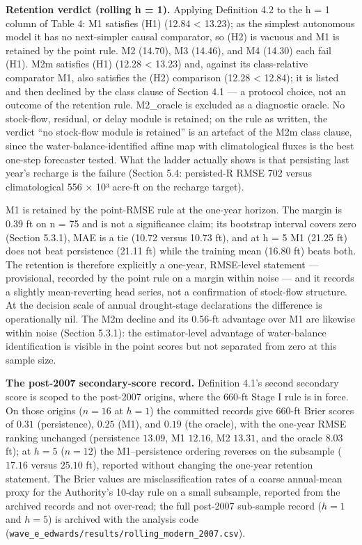 \documentclass[11pt]{article}
\begin{document}
\textbf{Retention verdict (rolling h = 1).} Applying Definition 4.2 to
the h = 1 column of Table 4: M1 satisfies (H1) (12.84 \textless{}
13.23); as the simplest autonomous model it has no next-simpler causal
comparator, so (H2) is vacuous and M1 is retained by the point rule. M2
(14.70), M3 (14.46), and M4 (14.30) each fail (H1). M2m satisfies (H1)
(12.28 \textless{} 13.23) and, against its class-relative comparator M1,
also satisfies the (H2) comparison (12.28 \textless{} 12.84); it is
listed and then declined by the class clause of Section 4.1 --- a
protocol choice, not an outcome of the retention rule. M2\_oracle is
excluded as a diagnostic oracle. No stock-flow, residual, or delay
module is retained; on the rule as written, the verdict ``no stock-flow
module is retained'' is an artefact of the M2m class clause, since the
water-balance-identified affine map with climatological fluxes is the
best one-step forecaster tested. What the ladder actually shows is that
persisting last year's recharge is the failure (Section 5.4: persisted-R
RMSE 702 versus climatological 556 × 10³ acre-ft on the recharge
target).

M1 is retained by the point-RMSE rule at the one-year horizon. The
margin is 0.39 ft on n = 75 and is not a significance claim; its
bootstrap interval covers zero (Section 5.3.1), MAE is a tie (10.72
versus 10.73 ft), and at h = 5 M1 (21.25 ft) does not beat persistence
(21.11 ft) while the training mean (16.80 ft) beats both. The retention
is therefore explicitly a one-year, RMSE-level statement ---
provisional, recorded by the point rule on a margin within noise --- and
it records a slightly mean-reverting head series, not a confirmation of
stock-flow structure. At the decision scale of annual drought-stage
declarations the difference is operationally nil. The M2m decline and
its 0.56-ft advantage over M1 are likewise within noise (Section 5.3.1):
the estimator-level advantage of water-balance identification is visible
in the point scores but not separated from zero at this sample size.

\textbf{The post-2007 secondary-score record.} Definition 4.1's second
secondary score is scoped to the post-2007 origins, where the 660-ft
Stage I rule is in force. On those origins (\(n = 16\) at \(h = 1\)) the
committed records give 660-ft Brier scores of \(0.31\) (persistence),
\(0.25\) (M1), and \(0.19\) (the oracle), with the one-year RMSE ranking
unchanged (persistence \(13.09\), M1 \(12.16\), M2 \(13.31\), and the
oracle \(8.03\) ft); at \(h = 5\) (\(n = 12\)) the M1--persistence
ordering reverses on the subsample (\(17.16\) versus \(25.10\) ft),
reported without changing the one-year retention statement. The Brier
values are misclassification rates of a coarse annual-mean proxy for the
Authority's 10-day rule on a small subsample, reported from the archived
records and not over-read; the full post-2007 sub-sample record
(\(h = 1\) and \(h = 5\)) is archived with the analysis code
(\texttt{wave\_e\_edwards/results/rolling\_modern\_2007.csv}).
\end{document}
